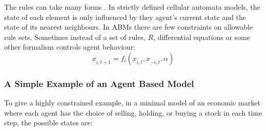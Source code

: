 The rules can take many forms \cite{iltanen_cellular_2012, kennedy_modelling_2012}. %
In strictly defined cellular automata models, the state of each element is only influenced by they agent's current state and the state of its nearest neighbours. In ABMs there are few constraints on allowable rule sets.
Sometimes instead of a set of rules, $R$, differential equations or some other formalism controls agent behaviour:
  \begin{equation}
  \underbar{x}_{i,t+1} = f_i(\underbar{x}_{i,t},\underbar{x}_{-i,t},\alpha)
\end{equation}



%
%




\subsubsection{A Simple Example of an Agent Based Model}

To give a highly constrained example, in a minimal model of an economic market    
where each agent has the choice of selling, holding, or buying a stock in each time step,  the possible states are:

